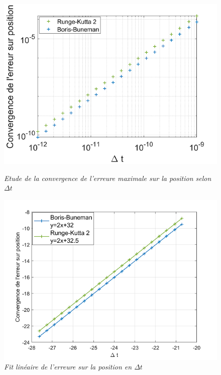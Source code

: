 \documentclass[a4paper,12pt,twoside]{article}
\begin{document}
	
	\begin{figure}[h]
				\begin{minipage}[c]{.46\linewidth}
					\centering
					\includegraphics[scale = 0.6]{conv_pos_RK_BB.png}
					\caption{\em\label{Fig: Conv Pos} Etude de la convergence de l'erreure maximale sur la position selon $\Delta t$}
				\end{minipage}
				\hfill%
				\begin{minipage}[c]{.46\linewidth}
					\centering
					\includegraphics[scale = 0.6]{fit_lin_pos.png}
					\caption{\em\label{Fig: Fit Lin Pos} Fit lin\'eaire de l'erreure sur la position en $\Delta t$}
				\end{minipage}
			\end{figure}
			
\end{document}
